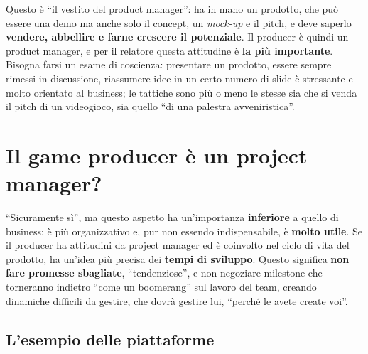 Questo è ``il vestito del product manager'': ha in mano un prodotto, che può
essere una demo ma anche solo il concept, un \emph{mock-up} e il pitch, e deve
saperlo \textbf{vendere, abbellire e farne crescere il potenziale}. Il producer
è quindi un product manager, e per il relatore questa attitudine è
\textbf{la più importante}. Bisogna farsi un esame di coscienza: presentare un
prodotto, essere sempre rimessi in discussione, riassumere idee in un certo
numero di slide è stressante e molto orientato al business; le tattiche sono più
o meno le stesse sia che si venda il pitch di un videogioco, sia quello ``di una
palestra avveniristica''.

\section{Il game producer è un project manager?}
\label{sec:z5-project-manager}

``Sicuramente sì'', ma questo aspetto ha un'importanza \textbf{inferiore} a
quello di business: è più organizzativo e, pur non essendo indispensabile, è
\textbf{molto utile}. Se il producer ha attitudini da project manager ed è
coinvolto nel ciclo di vita del prodotto, ha un'idea più precisa dei
\textbf{tempi di sviluppo}. Questo significa \textbf{non fare promesse
sbagliate}, ``tendenziose'', e non negoziare milestone che torneranno indietro
``come un boomerang'' sul lavoro del team, creando dinamiche difficili da
gestire, che dovrà gestire lui, ``perché le avete create voi''.

\subsection{L'esempio delle piattaforme}

